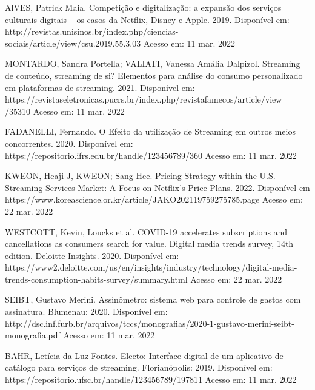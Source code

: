 \documentclass[conference]{IEEEtran}
\begin{document}
\begin{thebibliography}{00}

 AlVES, Patrick Maia. Competição e digitalização: a expansão dos serviços culturais-digitais – os casos da Netflix, Disney e Apple. 2019. Disponível em: http://revistas.unisinos.br/index.php/ciencias-sociais/article/view/csu.2019.55.3.03 Acesso em: 11 mar. 2022\newline

 MONTARDO, Sandra Portella; VALIATI, Vanessa Amália Dalpizol. Streaming de conteúdo, streaming de si? Elementos para análise do consumo personalizado em plataformas de streaming. 2021. Disponível em: https://revistaseletronicas.pucrs.br/index.php/revistafamecos/article/view\\/35310 Acesso em: 11 mar. 2022\newline

 FADANELLI, Fernando. O Efeito da utilização de Streaming em outros meios concorrentes. 2020. Disponível em: https://repositorio.ifrs.edu.br/handle/123456789/360 Acesso em: 11 mar. 2022\newline

 KWEON, Heaji J, KWEON; Sang Hee. Pricing Strategy within the U.S. Streaming Services Market: A Focus on Netflix's Price Plans. 2022. Disponível em https://www.koreascience.or.kr/article/JAKO202119759275785.page Acesso em: 22 mar. 2022\newline

 WESTCOTT, Kevin, Loucks et al. COVID-19 accelerates subscriptions and cancellations as consumers search for value. Digital media trends survey, 14th edition. Deloitte Insights. 2020. Disponível em: https://www2.deloitte.com/us/en/insights/industry/technology/digital-media-trends-consumption-habits-survey/summary.html Acesso em: 22 mar. 2022\newline

 SEIBT, Gustavo Merini. Assinômetro: sistema web para controle de gastos com assinatura. Blumenau: 2020. Disponível em: http://dsc.inf.furb.br/arquivos/tccs/monografias/2020-1-gustavo-merini-seibt-monografia.pdf Acesso em: 11 mar. 2022\newline

 BAHR, Letícia da Luz Fontes. Electo: Interface digital de um aplicativo de catálogo para serviços de streaming. Florianópolis: 2019. Disponível em: https://repositorio.ufsc.br/handle/123456789/197811 Acesso em: 11 mar. 2022\newline

\end{thebibliography}
\end{document}
